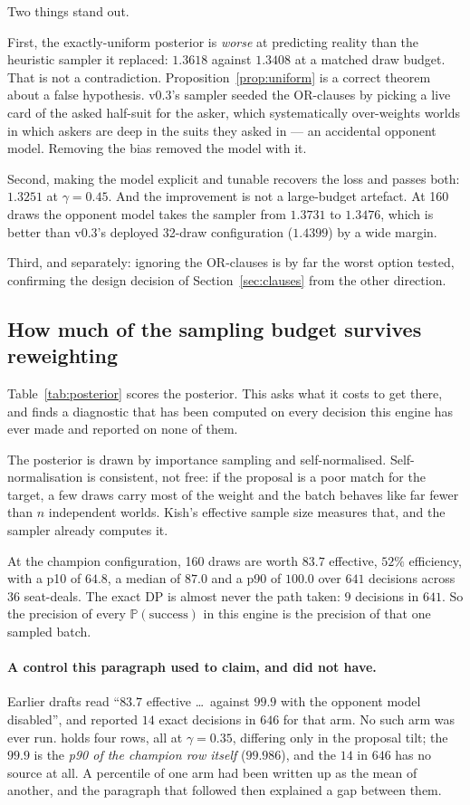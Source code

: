 \documentclass[11pt,letterpaper]{article}
\newcommand{\Prob}{\ensuremath{\mathbb{P}}}
\begin{document}
Two things stand out.

First, the exactly-uniform posterior is \emph{worse} at predicting reality than
the heuristic sampler it replaced: $1.3618$ against $1.3408$ at a matched draw
budget. That is not a contradiction. Proposition~\ref{prop:uniform} is a correct
theorem about a false hypothesis. v0.3's sampler seeded the OR-clauses by
picking a live card of the asked half-suit for the asker, which systematically
over-weights worlds in which askers are deep in the suits they asked in --- an
accidental opponent model. Removing the bias removed the model with it.

Second, making the model explicit and tunable recovers the loss and passes both:
$1.3251$ at $\gamma = 0.45$. And the improvement is not a large-budget artefact.
At 160 draws the opponent model takes the sampler from $1.3731$ to $1.3476$,
which is better than v0.3's deployed 32-draw configuration ($1.4399$) by a wide
margin.

Third, and separately: ignoring the OR-clauses is by far the worst option
tested, confirming the design decision of Section~\ref{sec:clauses} from the
other direction.

\subsection{How much of the sampling budget survives reweighting}
\label{sec:res-ess}

Table~\ref{tab:posterior} scores the posterior. This asks what it costs to get
there, and finds a diagnostic that has been computed on every decision this
engine has ever made and reported on none of them.

The posterior is drawn by importance sampling and self-normalised.
Self-normalisation is consistent, not free: if the proposal is a poor match for
the target, a few draws carry most of the weight and the batch behaves like far
fewer than $n$ independent worlds. Kish's effective sample size measures that,
and the sampler already computes it.

At the champion configuration, 160 draws are worth $83.7$ effective, $52\%$
efficiency, with a p10 of $64.8$, a median of $87.0$ and a p90 of $100.0$
over $641$ decisions across $36$ seat-deals. The exact DP is almost never the
path taken: $9$ decisions in $641$. So the precision of every
$\Prob(\text{success})$ in this engine is the precision of that one sampled
batch.

\paragraph{A control this paragraph used to claim, and did not have.} Earlier
drafts read ``$83.7$ effective \dots\ against $99.9$ with the opponent model
disabled'', and reported $14$ exact decisions in $646$ for that arm. No such arm
was ever run.  holds four rows, all at
$\gamma = 0.35$, differing only in the proposal tilt; the $99.9$ is the
\emph{p90 of the champion row itself} ($99.986$), and the $14$ in $646$ has no
source at all. A percentile of one arm had been written up as the mean of
another, and the paragraph that followed then explained a gap between them.
\end{document}

